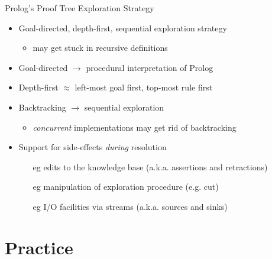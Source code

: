\documentclass[presentation]{beamer}\mode<presentation>{\usetheme{AMSBolognaFC}}
\begin{document}

\begin{frame}{Prolog's Proof Tree Exploration Strategy}
    \begin{itemize}
        \item Goal-directed, depth-first, sequential exploration strategy
        \begin{itemize}
            \item may get stuck in recursive definitions
        \end{itemize}

        \vfill

        \item Goal-directed $\rightarrow$ \alert{procedural} interpretation of Prolog
        
        \vfill

        \item Depth-first $\approx$ \alert{left-most} goal first, \alert{top-most} rule first
        
        \vfill

        \item \alert{Backtracking} $\rightarrow$ sequential exploration
        \begin{itemize}
            \item \emph{concurrent} implementations may get rid of backtracking
        \end{itemize}

        \vfill

        \item Support for \alert{side-effects} \emph{during} resolution
        \begin{itemize}
            \item[eg] edits to the knowledge base (a.k.a. assertions and retractions)
            \item[eg] manipulation of exploration procedure (e.g. cut)
            \item[eg] I/O facilities via streams (a.k.a. sources and sinks) 
        \end{itemize}
    \end{itemize}
\end{frame}

\section{Practice}
\end{document}
